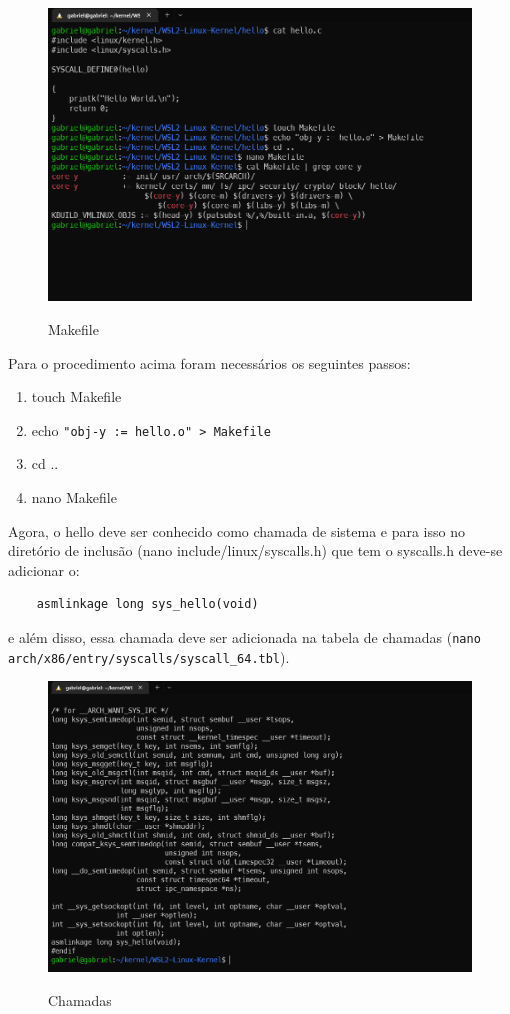 \documentclass[a4paper, 12pt]{article}
\begin{document}
\begin{figure}[!ht]
\centering 
\includegraphics[width=13.5cm]{cat_mf.png}
\label{figura:catmf}
\caption{Makefile}
\end{figure}

Para o procedimento acima foram necessários os seguintes passos:

\begin{enumerate}
    \item touch Makefile
    \item echo \texttt{"obj-y := hello.o" > Makefile}
    \item cd ..
    \item nano Makefile
\end{enumerate}

Agora, o hello deve ser conhecido como chamada de sistema e para isso no diretório de inclusão (nano include/linux/syscalls.h) que tem o syscalls.h deve-se adicionar o:
\begin{lstlisting} 
    asmlinkage long sys_hello(void) 
\end{lstlisting}  
e além disso, essa chamada deve ser adicionada na tabela de chamadas (\texttt{nano arch/x86/entry/syscalls/syscall\_64.tbl}).

\newpage 

\begin{figure}[!ht]
\centering 
\includegraphics[width=13.5cm]{cat_syscalls_h.png}
\label{figura:catsyscallsh}
\caption{Chamadas}
\end{figure}
\end{document}
